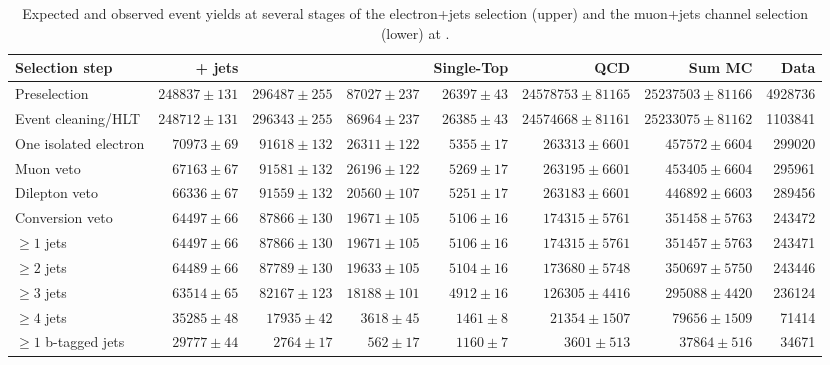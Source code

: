 \begin{table}
  \centering
   \caption{Expected and observed event yields at several stages of the electron+jets selection (upper) and
   the muon+jets channel selection (lower) at \TeV.}
    \label{tab:cut_flow_7TeV}
    \resizebox{\columnwidth}{!} {
    \begin{tabular}{lrrrrrrr}
    \hline
    \hline
	Selection step & \ttbar + jets & \WpJets & \ZpJets & Single-Top & QCD & Sum MC & Data \\
	\hline
	Preselection  &  $248837 \pm 131$ &  $296487 \pm 255$ &  $87027 \pm 237$ &  $26397 \pm 43$ &  $24578753 \pm 81165$ &  $25237503 \pm 81166$ &  4928736 \\ 
	Event cleaning/HLT  &  $248712 \pm 131$ &  $296343 \pm 255$ &  $86964 \pm 237$ &  $26385 \pm 43$ &  $24574668 \pm 81161$ &  $25233075 \pm 81162$ &  1103841 \\ 
	One isolated electron  &  $70973 \pm 69$ &  $91618 \pm 132$ &  $26311 \pm 122$ &  $5355 \pm 17$ &  $263313 \pm 6601$ &  $457572 \pm 6604$ &  299020 \\ 
	Muon veto  &  $67163 \pm 67$ &  $91581 \pm 132$ &  $26196 \pm 122$ &  $5269 \pm 17$ &  $263195 \pm 6601$ &  $453405 \pm 6604$ &  295961 \\ 
	Dilepton veto  &  $66336 \pm 67$ &  $91559 \pm 132$ &  $20560 \pm 107$ &  $5251 \pm 17$ &  $263183 \pm 6601$ &  $446892 \pm 6603$ &  289456 \\ 
	Conversion veto  &  $64497 \pm 66$ &  $87866 \pm 130$ &  $19671 \pm 105$ &  $5106 \pm 16$ &  $174315 \pm 5761$ &  $351458 \pm 5763$ &  243472 \\ 
	$\geq 1$ jets  &  $64497 \pm 66$ &  $87866 \pm 130$ &  $19671 \pm 105$ &  $5106 \pm 16$ &  $174315 \pm 5761$ &  $351457 \pm 5763$ &  243471 \\ 
	$\geq 2$ jets  &  $64489 \pm 66$ &  $87789 \pm 130$ &  $19633 \pm 105$ &  $5104 \pm 16$ &  $173680 \pm 5748$ &  $350697 \pm 5750$ &  243446 \\ 
	$\geq 3$ jets  &  $63514 \pm 65$ &  $82167 \pm 123$ &  $18188 \pm 101$ &  $4912 \pm 16$ &  $126305 \pm 4416$ &  $295088 \pm 4420$ &  236124 \\ 
	$\geq 4$ jets  &  $35285 \pm 48$ &  $17935 \pm 42$ &  $3618 \pm 45$ &  $1461 \pm 8$ &  $21354 \pm 1507$ &  $79656 \pm 1509$ &  71414 \\ 
	$\geq 1$ b-tagged jets  &  $29777 \pm 44$ &  $2764 \pm 17$ &  $562 \pm 17$ &  $1160 \pm 7$ &  $3601 \pm 513$ &  $37864 \pm 516$ &  34671 \\ 

\end{tabular}}
\end{table}
